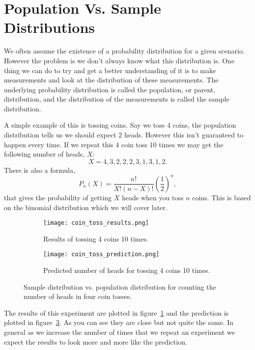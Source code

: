 \section{Population Vs. Sample Distributions}
    We often assume the existence of a probability distribution for a given scenario.
    However the problem is we don't always know what this distribution is.
    One thing we can do to try and get a better understanding of it is to make measurements and look at the distribution of these measurements.
    The underlying probability distribution is called the population, or parent, distribution, and the distribution of the measurements is called the sample distribution.
    
    A simple example of this is tossing coins.
    Say we toss 4 coins, the population distribution tells us we should expect 2 heads.
    However this isn't guaranteed to happen every time.
    If we repeat this 4 coin toss 10 times we may get the following number of heads, \(X\):
    \[X = 4, 3, 2, 2, 2, 3, 1, 3, 1, 2.\]
    There is also a formula, 
    \[P_n(X) = \frac{n!}{X!(n - X)!}\left(\frac{1}{2}\right)^n,\]
    that gives the probability of getting \(X\) heads when you toss \(n\) coins.
    This is based on the binomial distribution which we will cover later.
    \begin{figure}[ht]
        \centering
        \begin{subfigure}{0.4\textwidth}
            \centering
            \texttt{[image: coin\_toss\_results.png]}
            \caption{Results of tossing 4 coins 10 times.}
            \label{fig:results of tossing 4 coins}
        \end{subfigure}
        \begin{subfigure}{0.4\textwidth}
            \centering
            \texttt{[image: coin\_toss\_prediction.png]}
            \caption{Predicted number of heads for tossing 4 coins 10 times.}
            \label{fig:prediction of tossing 4 coins}
        \end{subfigure}
        \caption{Sample distribution vs. population distribution for counting the number of heads in four coin tosses.}
    \end{figure}
    The results of this experiment are plotted in figure~\ref{fig:results of tossing 4 coins} and the prediction is plotted in figure~\ref{fig:prediction of tossing 4 coins}.
    As you can see they are close but not quite the same.
    In general as we increase the number of times that we repeat an experiment we expect the results to look more and more like the prediction.
